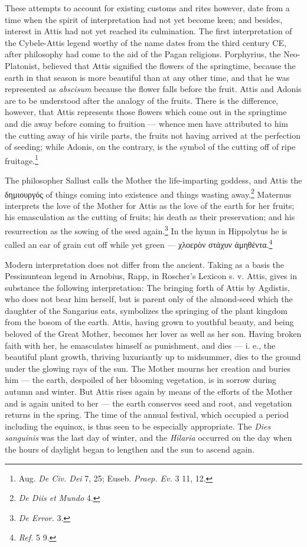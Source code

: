 \documentclass[a4paper, 11pt, oneside, polutonikogreek, english]{article}
\begin{document}
These attempts to account for existing customs and rites however, date from a time when the spirit of interpretation had not yet become keen; and besides, interest in Attis had not yet reached its culmination. The first interpretation of the Cybele-Attis legend worthy of the name dates from the third century \textsc{CE}, after philosophy had come to the aid of the Pagan religions. Porphyrius, the Neo-Platonist, believed that Attis signified the flowers of the springtime, because the earth in that season is more beautiful than at any other time, and that he was represented as \emph{abscisum} because the flower falls before the fruit. Attis and Adonis are to be understood after the analogy of the fruits. There is the difference, however, that Attis represents those flowers which come out in the springtime and die away before coming to fruition --- whence men have attributed to him the cutting away of his virile parts, the fruits not having arrived at the perfection of seeding; while Adonis, on the contrary, is the symbol of the cutting off of ripe fruitage.\footnote{Aug. \emph{De Civ. Dei} 7, 25; Euseb. \emph{Praep. Ev.} 3 11, 12.}

The philosopher Sallust calls the Mother the life-imparting goddess, and Attis the δημιουργός of things coming into existence and things wasting away.\footnote{\emph{De Diis et Mundo} 4.} Maternus interprets the love of the Mother for Attis as the love of the earth for her fruits; his emasculation as the cutting of fruits; his death as their preservation; and his resurrection as the sowing of the seed again.\footnote{\emph{De Error.} 3.} In the hymn in Hippolytus he is called an ear of grain cut off while yet green --- χλοερὸν στάχυν ἀμηθέντα.\footnote{\emph{Ref.} 5 9.}

Modern interpretation does not differ from the ancient. Taking as a basis the Pessinuntean legend in Arnobius, Rapp, in Roscher's Lexicon s. v. Attis, gives in substance the following interpretation: The bringing forth of Attis by Agdistis, who does not bear him herself, but is parent only of the almond-seed which the daughter of the Sangarius eats, symbolizes the springing of the plant kingdom from the bosom of the earth. Attis, having grown to youthful beauty, and being beloved of the Great Mother, becomes her lover as well as her son. Having broken faith with her, he emasculates himself as punishment, and dies --- i. e., the beautiful plant growth, thriving luxuriantly up to midsummer, dies to the ground under the glowing rays of the sun. The Mother mourns her creation and buries him --- the earth, despoiled of her blooming vegetation, is in sorrow during autumn and winter. But Attis rises again by means of the efforts of the Mother and is again united to her --- the earth conserves seed and root, and vegetation returns in the spring. The time of the annual festival, which occupied a period including the equinox, is thus seen to be especially appropriate. The \emph{Dies sanguinis} was the last day of winter, and the \emph{Hilaria} occurred on the day when the hours of daylight began to lengthen and the sun to ascend again.
\end{document}
